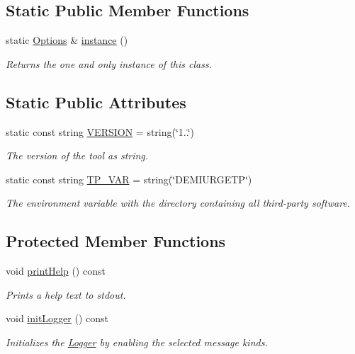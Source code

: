 \subsection*{Static Public Member Functions}
\begin{DoxyCompactItemize}
\item 
static \hyperlink{classOptions}{Options} \& \hyperlink{classOptions_a3ee81ffdab9838ceb8f6f43fac679869}{instance} ()
\begin{DoxyCompactList}\small\item\em Returns the one and only instance of this class. \end{DoxyCompactList}\end{DoxyCompactItemize}
\subsection*{Static Public Attributes}
\begin{DoxyCompactItemize}
\item 
static const string \hyperlink{classOptions_ab8a901c1ad7d3ab672db099fb4c0b197}{V\-E\-R\-S\-I\-O\-N} = string(\char`\"{}1..\char`\"{})
\begin{DoxyCompactList}\small\item\em The version of the tool as string. \end{DoxyCompactList}\item 
static const string \hyperlink{classOptions_ad3285bfd4c5984cd79988ddce49ee507}{T\-P\-\_\-\-V\-A\-R} = string(\char`\"{}D\-E\-M\-I\-U\-R\-G\-E\-T\-P\char`\"{})
\begin{DoxyCompactList}\small\item\em The environment variable with the directory containing all third-\/party software. \end{DoxyCompactList}\end{DoxyCompactItemize}
\subsection*{Protected Member Functions}
\begin{DoxyCompactItemize}
\item 
void \hyperlink{classOptions_a9fb71bc356f663be2346fb73806aed6b}{print\-Help} () const 
\begin{DoxyCompactList}\small\item\em Prints a help text to stdout. \end{DoxyCompactList}\item 
void \hyperlink{classOptions_a4747e24243c28fcff14f23a9c4f8eecf}{init\-Logger} () const 
\begin{DoxyCompactList}\small\item\em Initializes the \hyperlink{classLogger}{Logger} by enabling the selected message kinds. \end{DoxyCompactList}\end{DoxyCompactItemize}
